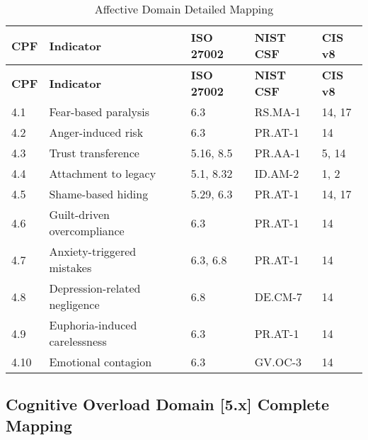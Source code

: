 \documentclass[11pt,a4paper]{article}
\begin{document}
\begin{longtable}{p{1cm}p{4cm}p{2.5cm}p{2.5cm}p{2cm}}
\caption{Affective Domain Detailed Mapping} \\
\toprule
\textbf{CPF} & \textbf{Indicator} & \textbf{ISO 27002} & \textbf{NIST CSF} & \textbf{CIS v8} \\
\midrule
\endfirsthead
\toprule
\textbf{CPF} & \textbf{Indicator} & \textbf{ISO 27002} & \textbf{NIST CSF} & \textbf{CIS v8} \\
\midrule
\endhead
\bottomrule
\endlastfoot

4.1 & Fear-based paralysis & 6.3 & RS.MA-1 & 14, 17 \\
4.2 & Anger-induced risk & 6.3 & PR.AT-1 & 14 \\
4.3 & Trust transference & 5.16, 8.5 & PR.AA-1 & 5, 14 \\
4.4 & Attachment to legacy & 5.1, 8.32 & ID.AM-2 & 1, 2 \\
4.5 & Shame-based hiding & 5.29, 6.3 & PR.AT-1 & 14, 17 \\
4.6 & Guilt-driven overcompliance & 6.3 & PR.AT-1 & 14 \\
4.7 & Anxiety-triggered mistakes & 6.3, 6.8 & PR.AT-1 & 14 \\
4.8 & Depression-related negligence & 6.8 & DE.CM-7 & 14 \\
4.9 & Euphoria-induced carelessness & 6.3 & PR.AT-1 & 14 \\
4.10 & Emotional contagion & 6.3 & GV.OC-3 & 14 \\

\end{longtable}

\subsection{Cognitive Overload Domain [5.x] Complete Mapping}
\end{document}
